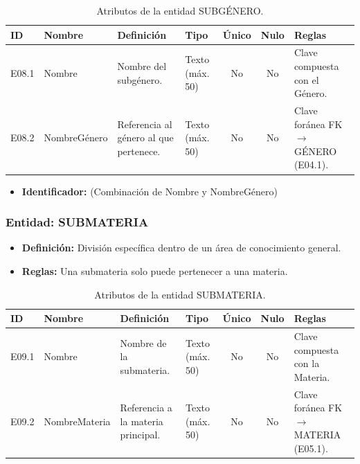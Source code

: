 	\begin{table}[H]
		\centering
		\caption{Atributos de la entidad SUBGÉNERO.}
		\label{tab:dict_subgenero}
		\small
		\begin{tabularx}{\textwidth}{l l X l c c X}
			\toprule
			\textbf{ID} & \textbf{Nombre} & \textbf{Definición} & \textbf{Tipo} & \textbf{Único} & \textbf{Nulo} & \textbf{Reglas} \\
			\midrule
			E08.1 & Nombre & Nombre del subgénero. & Texto (máx. 50) & No & No & Clave compuesta con el Género. \\
			\addlinespace
			E08.2 & NombreGénero & Referencia al género al que pertenece. & Texto (máx. 50) & No & No & Clave foránea FK $\rightarrow$ GÉNERO (E04.1). \\
			\bottomrule
		\end{tabularx}
	\end{table}
	
	\begin{itemize}
		\item\textbf{Identificador:} (Combinación de Nombre y NombreGénero)
	\end{itemize}
	
	\subsubsection{Entidad: SUBMATERIA}
	\begin{itemize}
		\item\textbf{Definición:} División específica dentro de un área de conocimiento general.
		\item\textbf{Reglas:} Una submateria solo puede pertenecer a una materia.
	\end{itemize}
	
	\begin{table}[H]
		\centering
		\caption{Atributos de la entidad SUBMATERIA.}
		\label{tab:dict_submateria}
		\small
		\begin{tabularx}{\textwidth}{l l X l c c X}
			\toprule
			\textbf{ID} & \textbf{Nombre} & \textbf{Definición} & \textbf{Tipo} & \textbf{Único} & \textbf{Nulo} & \textbf{Reglas} \\
			\midrule
			E09.1 & Nombre & Nombre de la submateria. & Texto (máx. 50) & No & No & Clave compuesta con la Materia. \\
			\addlinespace
			E09.2 & NombreMateria & Referencia a la materia principal. & Texto (máx. 50) & No & No & Clave foránea FK $\rightarrow$ MATERIA (E05.1). \\
			\bottomrule
		\end{tabularx}
	\end{table}
	
